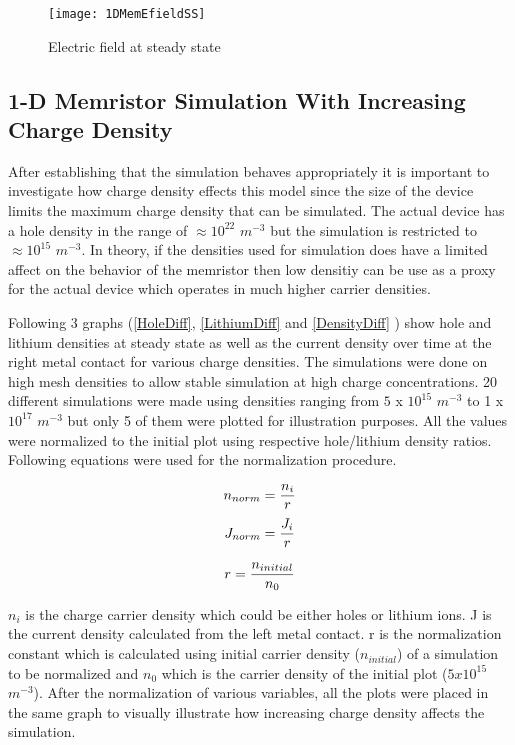 {\begin{figure}[!htp]
\centering
\texttt{[image: 1DMemEfieldSS]}
\caption{Electric field at steady state} 
\label{MemEss}
\end{figure}



\clearpage
\subsection{1-D Memristor Simulation With Increasing Charge Density}

After establishing that the simulation behaves appropriately it is important to investigate how charge density effects this model since the size of the device limits the maximum charge density that can be simulated. The actual device has a hole density in the range of $ \approx 10^{22}$ $m^{-3}$ but the simulation is restricted to $\approx 10^{15}$ $m^{-3}$. In theory, if the densities used for simulation does have a limited affect on the behavior of the memristor then low densitiy can be use as a proxy for the actual device which operates in much higher carrier densities.

 Following 3 graphs (\ref{HoleDiff}, \ref{LithiumDiff} and \ref{DensityDiff} ) show hole and lithium densities at steady state as well as the current density over time at the right metal contact for various charge densities. The simulations were done on high mesh densities to allow stable simulation at high charge concentrations. 20 different simulations were made using densities ranging from $5$ x $10^{15}$  $m^{-3}$ to 1 x $10^{17}$  $m^{-3}$ but only 5 of them were plotted for illustration purposes. All the values were normalized to the initial plot using respective hole/lithium density ratios. Following equations were used for the normalization procedure.


\begin{equation}
\centering
n_{norm}= \frac{n_i}{r} 
\end{equation}
\begin{equation}
\centering
J_{norm}= \frac{J_i}{r} 
\end{equation}

\begin{equation}
\centering
r = \frac{n_{initial}}{n_{0}}
\label{NormConst}
\end{equation}

$n_{i}$ is the charge carrier density which could be either holes or lithium ions. J is the current density calculated from the left metal contact. r is the normalization constant which is calculated using initial carrier density ($n_{initial}$) of a simulation to be normalized and $n_{0}$ which is the carrier density of the initial plot ($5x10^{15}$ $m^{-3}$). After the normalization of various variables, all the plots were placed in the same graph to visually illustrate how increasing charge density affects the simulation. 

}
